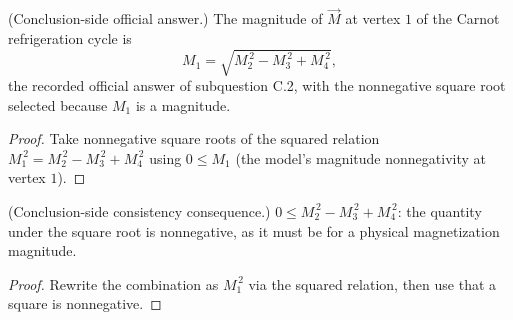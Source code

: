 \begin{theorem}
\label{thm:IPhO2026Problems_problem_IPhO_2026_3_C_2:m1_eq_sqrt}
(Conclusion-side official answer.) The magnitude of $\vec M$ at
vertex $1$ of the Carnot refrigeration cycle is
\[
M_1 = \sqrt{M_2^{\,2} - M_3^{\,2} + M_4^{\,2}},
\]
the recorded official answer of subquestion C.2, with the nonnegative
square root selected because $M_1$ is a magnitude.
\end{theorem}
\begin{proof}
Take nonnegative square roots of the squared relation
$M_1^{\,2} = M_2^{\,2} - M_3^{\,2} + M_4^{\,2}$ using
$0 \le M_1$ (the model's magnitude nonnegativity at vertex $1$).
\end{proof}

\begin{theorem}
\label{thm:IPhO2026Problems_problem_IPhO_2026_3_C_2:m1_sq_arg_nonneg}
(Conclusion-side consistency consequence.)
$0 \le M_2^{\,2} - M_3^{\,2} + M_4^{\,2}$: the quantity under the
square root is nonnegative, as it must be for a physical
magnetization magnitude.
\end{theorem}
\begin{proof}
Rewrite the combination as $M_1^{\,2}$ via the squared relation,
then use that a square is nonnegative.
\end{proof}
